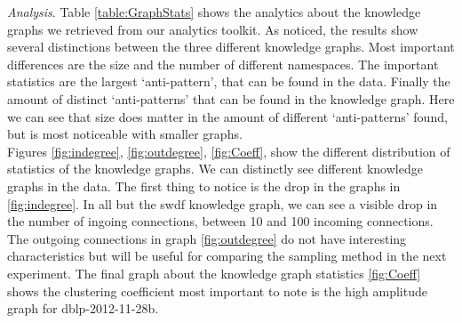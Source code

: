 \documentclass[11pt,letterpaper ,oneside ]{book}
\begin{document}
	\textit{Analysis}. Table \ref{table:GraphStats} shows the analytics about the knowledge graphs we retrieved from our analytics toolkit. As noticed, the results show several distinctions between the three different knowledge graphs. Most important differences are the size and the number of different namespaces. The important statistics are the largest `anti-pattern', that can be found in the data. Finally the amount of distinct `anti-patterns' that can be found in the knowledge graph. Here we can see that size does matter in the amount of different `anti-patterns' found, but is most noticeable with smaller graphs. \\
	Figures \ref{fig:indegree},  \ref{fig:outdegree},  \ref{fig:Coeff}, show the different distribution of statistics of the knowledge graphs. We can distinctly see different knowledge graphs in the data. The first thing to notice is the drop in the graphs in \ref{fig:indegree}. In all but the swdf knowledge graph, we can see a visible drop in the number of ingoing connections, between 10 and 100 incoming connections. \\
	The outgoing connections in graph \ref{fig:outdegree} do not have interesting characteristics but will be useful for comparing the sampling method in the next experiment. 
	The final graph about the knowledge graph statistics \ref{fig:Coeff} shows the clustering coefficient most important to note is the high amplitude graph for dblp-2012-11-28b. \\
	\begin{table}[!t]
		\centering
		\caption{table showing several statistics about graphs.}
		\label{table:GraphStats}
	\end{table}
	
\end{document}

